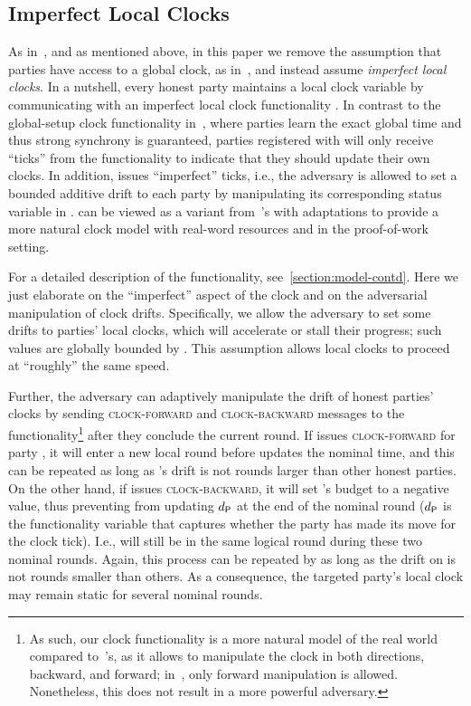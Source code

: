 \subsection{Imperfect Local Clocks}
\label{subsec:imperfect-local-clock}

As in~\cite{EC:BGKRZ21}, and as mentioned above, in this paper we remove the assumption that parties have access to a global clock, as in~\cite{EC:GarKiaLeo15,C:GarKiaLeo17,EC:PasSeeash17,C:BMTZ17,EPRINT:GarKiaLeo20}, and instead assume \emph{imperfect local clocks}.
%
In a nutshell, every honest party maintains a local clock variable by communicating with an imperfect local clock functionality \funcImpClock.
%
In contrast to the global-setup clock functionality in~\cite{TCC:KMTZ13}, where parties learn the exact global time and thus strong synchrony is guaranteed, parties registered with \funcImpClock will only receive ``ticks'' from the functionality to indicate that they should update their own clocks.
%
In addition, \funcImpClock issues ``imperfect'' ticks, i.e., the adversary is allowed to set a bounded additive drift to each party by manipulating its corresponding status variable in \funcImpClock.
%
\funcImpClock can be viewed as a variant from~\cite{EC:BGKRZ21}'s with adaptations to provide a more natural clock model with real-word resources and in the proof-of-work setting.

For a detailed description of the functionality, see~\cref{section:model-contd}.
%
Here we just elaborate on the ``imperfect'' aspect of the clock and on the adversarial manipulation of clock drifts.
%
Specifically, we allow the adversary to set some drifts to parties' local clocks, which will accelerate or stall their progress; such values are globally bounded by \maxdrift.
%
This assumption allows local clocks to proceed at ``roughly'' the same speed.

Further, the adversary \adv can adaptively manipulate the drift of honest parties' clocks by sending \textsc{clock-forward} and \textsc{clock-backward} messages to the functionality\footnote{As such, our clock functionality is a more natural model of the real world compared to~\cite{EC:BGKRZ21}'s, as it allows \adv to manipulate the clock in both directions, backward, and forward; in~\cite{EC:BGKRZ21}, only forward manipulation is allowed. Nonetheless, this does not result in a more powerful adversary.} after they conclude the current round.
%
If \adv issues \textsc{clock-forward} for party \party, it will enter a new local round before \funcImpClock updates the nominal time, and this can be repeated as long as \party's drift is not \maxdrift rounds larger than other honest parties.
%
On the other hand, if \adv issues \textsc{clock-backward}, it will set \party's budget to a negative value, thus preventing \funcImpClock from updating $d_\mathsf{P}$ at the end of the nominal round ($d_\mathsf{P}$ is the functionality variable that captures whether the party \party has made its move for the clock tick).
%
I.e., \party will still be in the same logical round during these two nominal rounds.
%
Again, this process can be repeated by \adv as long as the drift on \party is not \maxdrift rounds smaller than others.
%
As a consequence, the targeted party's local clock may remain static for several nominal rounds.
